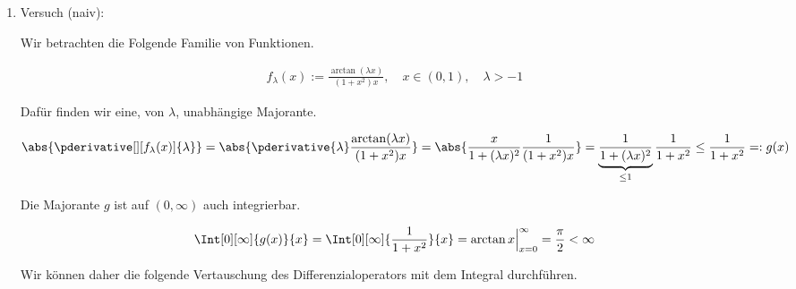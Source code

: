 \begin{solution}

\phantom{}

\begin{enumerate}[label = \arabic*.]

    \item Versuch (naiv):
    
    Wir betrachten die Folgende Familie von Funktionen.

    \begin{align*}
        f_\lambda(x)
        :=
        \frac
        {
            \arctan(\lambda x)
        }{
            (1 + x^2) x
        },
        \quad
        x \in (0, 1),
        \quad
        \lambda > -1
    \end{align*}

    Dafür finden wir eine, von $\lambda$, unabhängige Majorante.

    \begin{align*}
        \abs
        {
            \pderivative[][f_\lambda(x)]{\lambda}
        }
        =
        \abs
        {
            \pderivative{\lambda}
            \frac
            {
                \arctan(\lambda x)
            }{
                (1 + x^2) x
            }    
        }
        =
        \abs
        {
            \frac{x}
            {
                1 + (\lambda x)^2
            }    
            \frac{1}
            {
                (1 + x^2) x
            }    
        }
        =
        \underbrace
        {
            \frac{1}
            {
                1 + (\lambda x)^2
            }        
        }_{
            \leq 1
        }
        \frac{1}
        {
            1 + x^2
        }    
        \leq
        \frac{1}
        {
            1 + x^2
        }
        =:
        g(x)
    \end{align*}

    Die Majorante $g$ ist auf $(0, \infty)$ auch integrierbar.

    \begin{align*}
        \Int[0][\infty]{g(x)}{x}
        =
        \Int[0][\infty]
        {
            \frac{1}
            {
                1 + x^2
            }    
        }{x}
        =
        \arctan x \Big |_{x=0}^\infty
        =
        \frac{\pi}{2}
        <
        \infty
    \end{align*}

    Wir können daher die folgende Vertauschung des Differenzialoperators mit dem Integral durchführen.


\end{enumerate}
\end{solution}
